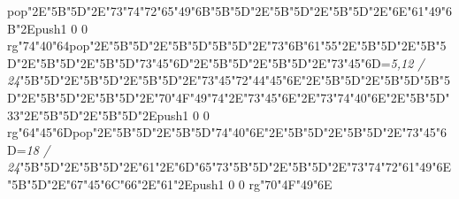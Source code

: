 pop{}\ipa\char"2E\ipa\char"5B\quad\quad\quad\ipa\char"5D\ipa\char"2E\ipa\char"73\ipa\char"74\ipa\char"72\ipa\char"65\ipa\char"49\ipa\char"6B\bigskip\ipa\char"5B\quad\quad\ipa\char"5D\ipa\char"2E\ipa\char"5B\quad\quad\quad\quad\ipa\char"5D\ipa\char"2E\ipa\char"5B\quad\ipa\char"5D\ipa\char"2E\ipa\char"6E\ipa\char"61\ipa\char"49\ipa\char"6B\ipa\char"2E\pdfcolorstack\match push{1 0 0 rg}\ipa\char"74\ipa\char"40\ipa\char"64\pdfcolorstack\match pop{}\ipa\char"2E\ipa\char"5B\quad\quad\quad\quad\ipa\char"5D\ipa\char"2E\ipa\char"5B\quad\quad\quad\ipa\char"5D\bigskip\ipa\char"5B\quad\ipa\char"5D\ipa\char"2E\ipa\char"73\ipa\char"6B\ipa\char"61\ipa\char"55\ipa\char"2E\ipa\char"5B\quad\quad\ipa\char"5D\ipa\char"2E\ipa\char"5B\quad\quad\quad\ipa\char"5D\ipa\char"2E\ipa\char"5B\quad\quad\ipa\char"5D\ipa\char"2E\ipa\char"5B\quad\quad\quad\quad\quad\quad\ipa\char"5D\bigskip\ipa\char"73\ipa\char"45\ipa\char"6D\ipa\char"2E\ipa\char"5B\quad\quad\ipa\char"5D\ipa\char"2E\ipa\char"5B\quad\quad\quad\ipa\char"5D\ipa\char"2E\ipa\char"73\ipa\char"45\ipa\char"6D\bigskip\vfill\footline={\hfill\tenrm\it 5,12 / 24}\eject\null\vfill\ipa\char"5B\quad\quad\quad\ipa\char"5D\ipa\char"2E\ipa\char"5B\quad\quad\quad\quad\ipa\char"5D\ipa\char"2E\ipa\char"5B\quad\ipa\char"5D\ipa\char"2E\ipa\char"73\ipa\char"45\ipa\char"72\bigskip\ipa\char"44\ipa\char"45\ipa\char"6E\ipa\char"2E\ipa\char"5B\quad\quad\quad\ipa\char"5D\ipa\char"2E\ipa\char"5B\quad\quad\quad\quad\quad\quad\ipa\char"5D\bigskip\ipa\char"5B\quad\quad\ipa\char"5D\ipa\char"2E\ipa\char"5B\quad\quad\quad\quad\ipa\char"5D\ipa\char"2E\ipa\char"5B\quad\ipa\char"5D\ipa\char"2E\ipa\char"70\ipa\char"4F\ipa\char"49\ipa\char"74\ipa\char"2E\ipa\char"73\ipa\char"45\ipa\char"6E\ipa\char"2E\ipa\char"73\ipa\char"74\ipa\char"40\ipa\char"6E\ipa\char"2E\ipa\char"5B\quad\quad\quad\ipa\char"5D\bigskip\ipa\char"33\ipa\char"2E\ipa\char"5B\quad\quad\quad\quad\ipa\char"5D\ipa\char"2E\ipa\char"5B\quad\quad\ipa\char"5D\ipa\char"2E\pdfcolorstack\match push{1 0 0 rg}\ipa\char"64\ipa\char"45\ipa\char"6D\pdfcolorstack\match pop{}\ipa\char"2E\ipa\char"5B\quad\quad\ipa\char"5D\ipa\char"2E\ipa\char"5B\quad\quad\quad\quad\quad\quad\ipa\char"5D\bigskip\ipa\char"74\ipa\char"40\ipa\char"6E\ipa\char"2E\ipa\char"5B\quad\quad\ipa\char"5D\ipa\char"2E\ipa\char"5B\quad\quad\quad\ipa\char"5D\ipa\char"2E\ipa\char"73\ipa\char"45\ipa\char"6D\bigskip\vfill\footline={\hfill\tenrm\it 18 / 24}\eject\null\vfill\ipa\char"5B\quad\quad\quad\ipa\char"5D\ipa\char"2E\ipa\char"5B\quad\quad\quad\quad\ipa\char"5D\ipa\char"2E\ipa\char"61\ipa\char"2E\ipa\char"6D\ipa\char"65\ipa\char"73\bigskip\ipa\char"5B\quad\quad\quad\ipa\char"5D\ipa\char"2E\ipa\char"5B\quad\quad\quad\ipa\char"5D\ipa\char"2E\ipa\char"73\ipa\char"74\ipa\char"72\ipa\char"61\ipa\char"49\ipa\char"6E\bigskip\ipa\char"5B\quad\quad\ipa\char"5D\ipa\char"2E\ipa\char"67\ipa\char"45\ipa\char"6C\ipa\char"66\ipa\char"2E\ipa\char"61\ipa\char"2E\pdfcolorstack\match push{1 0 0 rg}\ipa\char"70\ipa\char"4F\ipa\char"49\ipa\char"6E\pdfcolorstack\match 